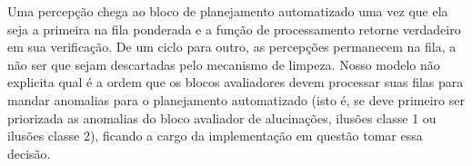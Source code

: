 Uma percepção chega ao bloco de planejamento automatizado uma vez que ela seja a primeira na fila ponderada e a função de processamento retorne verdadeiro em sua verificação. De um ciclo para outro, as percepções permanecem na fila, a não ser que sejam descartadas pelo mecanismo de limpeza. Nosso modelo não explicita qual é a ordem que os blocos avaliadores devem processar suas filas para mandar anomalias para o planejamento automatizado (isto é, se deve primeiro ser priorizada as anomalias do bloco avaliador de alucinações, ilusões classe 1 ou ilusões classe 2), ficando a cargo da implementação em questão tomar essa decisão.

